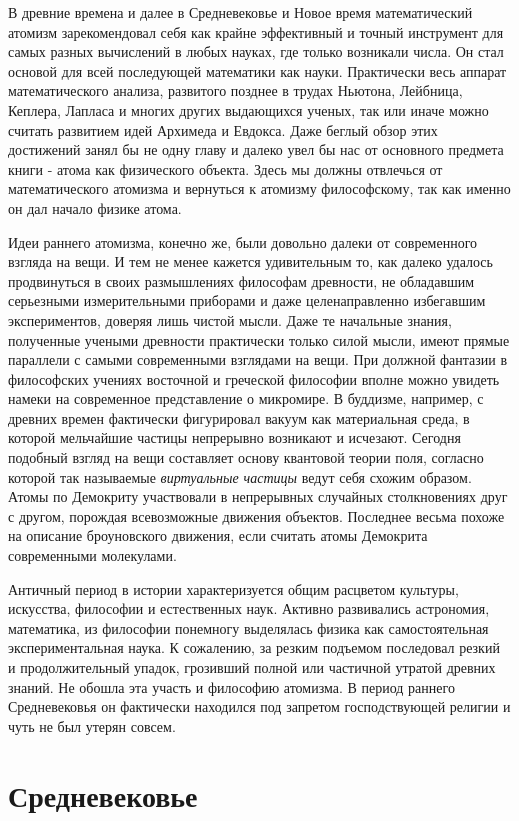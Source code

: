 В древние времена и далее в Средневековье и Новое время математический атомизм зарекомендовал себя как крайне эффективный и точный инструмент для самых разных вычислений в любых науках, где только возникали числа. 
Он стал основой для всей последующей математики как науки.
Практически весь аппарат математического анализа, развитого позднее в трудах Ньютона, Лейбница, Кеплера, Лапласа и многих других выдающихся ученых, так или иначе можно считать развитием идей Архимеда и Евдокса.
Даже беглый обзор этих достижений занял бы не одну главу и далеко увел бы нас от основного предмета книги - атома как физического объекта.
Здесь мы должны отвлечься от математического атомизма и вернуться к атомизму философскому, так как именно он дал начало физике атома.


Идеи раннего атомизма, конечно же, были довольно далеки от современного взгляда на вещи.
И тем не менее кажется удивительным то, как далеко удалось продвинуться в своих размышлениях философам древности, не обладавшим серьезными измерительными приборами и даже целенаправленно избегавшим экспериментов, доверяя лишь чистой мысли.
Даже те начальные знания, полученные учеными древности практически только силой мысли, имеют прямые параллели с самыми современными взглядами на вещи.
При должной фантазии в философских учениях восточной и греческой философии вполне можно увидеть намеки на современное представление о микромире.
В буддизме, например, с древних времен фактически фигурировал вакуум как материальная среда, в которой мельчайшие частицы непрерывно возникают и исчезают. 
Сегодня подобный взгляд на вещи составляет основу квантовой теории поля, согласно которой так называемые \textit{виртуальные частицы} ведут себя схожим образом. 
Атомы по Демокриту участвовали в непрерывных случайных столкновениях друг с другом, порождая всевозможные движения объектов. 
Последнее весьма похоже на описание броуновского движения, если считать атомы Демокрита современными молекулами.

Античный период в истории характеризуется общим расцветом культуры, искусства, философии и естественных наук.
Активно развивались астрономия, математика, из философии понемногу выделялась физика как самостоятельная экспериментальная наука.
К сожалению, за резким подъемом последовал резкий и продолжительный упадок, грозивший полной или частичной утратой древних знаний.
Не обошла эта участь и философию атомизма.
В период раннего Средневековья он фактически находился под запретом господствующей религии и чуть не был утерян совсем.


\section*{Средневековье}

